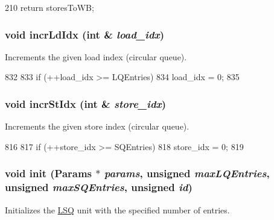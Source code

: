 \begin{DoxyCode}
210 { return storesToWB; }
\end{DoxyCode}
\hypertarget{classOzoneLSQ_a0e0f98133b2afd7aa1793ba30dd4a96b}{
\subsubsection[{incrLdIdx}]{\setlength{\rightskip}{0pt plus 5cm}void incrLdIdx (int \& {\em load\_\-idx})}}
\label{classOzoneLSQ_a0e0f98133b2afd7aa1793ba30dd4a96b}
Increments the given load index (circular queue). 


\begin{DoxyCode}
832 {
833     if (++load_idx >= LQEntries)
834         load_idx = 0;
835 }
\end{DoxyCode}
\hypertarget{classOzoneLSQ_a4ec2fe6ed54cf88c23fb214b87f850d1}{
\subsubsection[{incrStIdx}]{\setlength{\rightskip}{0pt plus 5cm}void incrStIdx (int \& {\em store\_\-idx})}}
\label{classOzoneLSQ_a4ec2fe6ed54cf88c23fb214b87f850d1}
Increments the given store index (circular queue). 


\begin{DoxyCode}
816 {
817     if (++store_idx >= SQEntries)
818         store_idx = 0;
819 }
\end{DoxyCode}
\hypertarget{classOzoneLSQ_ae8565b0968a8115705f1585e8aa21f75}{
\subsubsection[{init}]{\setlength{\rightskip}{0pt plus 5cm}void init ({\bf Params} $\ast$ {\em params}, \/  unsigned {\em maxLQEntries}, \/  unsigned {\em maxSQEntries}, \/  unsigned {\em id})}}
\label{classOzoneLSQ_ae8565b0968a8115705f1585e8aa21f75}
Initializes the \hyperlink{classLSQ}{LSQ} unit with the specified number of entries. 


